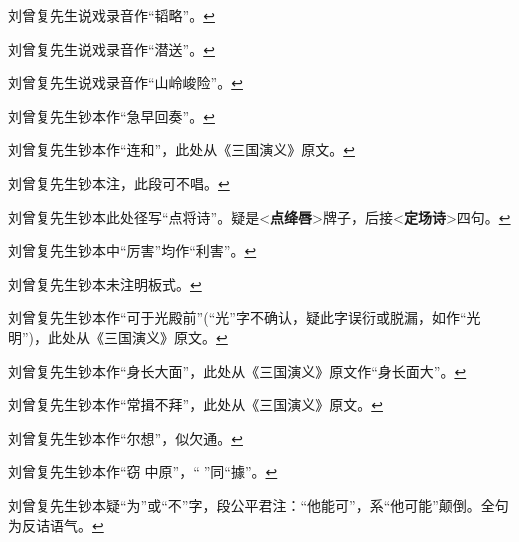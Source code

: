 \item
  \leavevmode\hypertarget{fn259}{}%
  刘曾复先生说戏录音作``韬略''。\protect\hyperlink{fnref259}{↩}
\item
  \leavevmode\hypertarget{fn260}{}%
  刘曾复先生说戏录音作``潜送''。\protect\hyperlink{fnref260}{↩}
\item
  \leavevmode\hypertarget{fn261}{}%
  刘曾复先生说戏录音作``山岭峻险''。\protect\hyperlink{fnref261}{↩}
\item
  \leavevmode\hypertarget{fn262}{}%
  刘曾复先生钞本作``急早回奏''。\protect\hyperlink{fnref262}{↩}
\item
  \leavevmode\hypertarget{fn263}{}%
  刘曾复先生钞本作``连和''，此处从《三国演义》原文。\protect\hyperlink{fnref263}{↩}
\item
  \leavevmode\hypertarget{fn264}{}%
  刘曾复先生钞本注，此段可不唱。\protect\hyperlink{fnref264}{↩}
\item
  \leavevmode\hypertarget{fn265}{}%
  刘曾复先生钞本此处径写``点将诗''。疑是\textless{}\textbf{点绛唇}\textgreater{}牌子，后接\textless{}\textbf{定场诗}\textgreater{}四句。\protect\hyperlink{fnref265}{↩}
\item
  \leavevmode\hypertarget{fn266}{}%
  刘曾复先生钞本中``厉害''均作``利害''。\protect\hyperlink{fnref266}{↩}
\item
  \leavevmode\hypertarget{fn267}{}%
  刘曾复先生钞本未注明板式。\protect\hyperlink{fnref267}{↩}
\item
  \leavevmode\hypertarget{fn268}{}%
  刘曾复先生钞本作``可于光殿前''(``光''字不确认，疑此字误衍或脱漏，如作``光明'')，此处从《三国演义》原文。\protect\hyperlink{fnref268}{↩}
\item
  \leavevmode\hypertarget{fn269}{}%
  刘曾复先生钞本作``身长大面''，此处从《三国演义》原文作``身长面大''。\protect\hyperlink{fnref269}{↩}
\item
  \leavevmode\hypertarget{fn270}{}%
  刘曾复先生钞本作``常揖不拜''，此处从《三国演义》原文。\protect\hyperlink{fnref270}{↩}
\item
  \leavevmode\hypertarget{fn271}{}%
  刘曾复先生钞本作``尔想''，似欠通。\protect\hyperlink{fnref271}{↩}
\item
  \leavevmode\hypertarget{fn272}{}%
  刘曾复先生钞本作``窃𢫑中原''，``𢫑''同``據''。\protect\hyperlink{fnref272}{↩}
\item
  \leavevmode\hypertarget{fn273}{}%
  刘曾复先生钞本疑``为''或``不''字，段公平君注：``他能可''，系``他可能''颠倒。全句为反诘语气。\protect\hyperlink{fnref273}{↩}
\item
  \leavevmode\hypertarget{fn274}{}%
